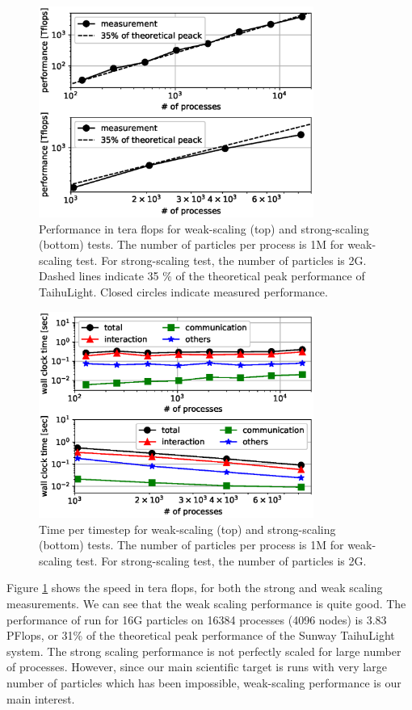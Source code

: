 \documentclass[]{pasj01}
\begin{document}
\begin{figure}
  \centering
    \includegraphics[width=9cm,clip]{./fig/performance.eps}
  \caption{Performance in tera flops for weak-scaling (top) and
    strong-scaling (bottom) tests. The number of particles per process
    is 1M for weak-scaling test. For strong-scaling test, the number
    of particles is 2G. Dashed lines indicate 35 \% of the theoretical
    peak performance of TaihuLight. Closed circles indicate measured
    performance.}
  \label{fig:performance}
\end{figure}

\begin{figure}
  \begin{center}
    \includegraphics[width=9cm,clip]{./fig/scaling.eps}
  \end{center}
  \caption{Time per timestep for weak-scaling (top) and strong-scaling
    (bottom) tests. The number of particles per process is 1M for
    weak-scaling test. For strong-scaling test, the number of
    particles is 2G.}
  \label{fig:scaling}
\end{figure}

Figure \ref{fig:performance} shows the speed in tera flops, for both
the strong and weak scaling measurements. We can see that the weak
scaling performance is quite good. The performance of run for 16G
particles on 16384 processes (4096 nodes) is 3.83 PFlops, or 31\% of
the theoretical peak performance of the Sunway TaihuLight system. The
strong scaling performance is not perfectly scaled for large number of
processes. However, since our main scientific target is runs with very
large number of particles which has been impossible, weak-scaling
performance is our main interest.
\end{document}
